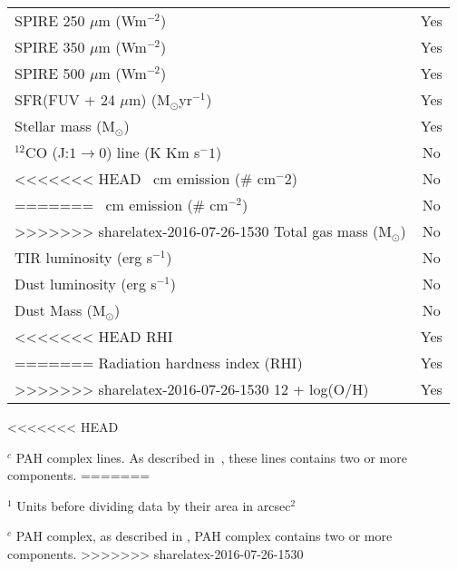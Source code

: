 \begin{table}
\begin{tabular}{ |l|c| }
SPIRE 250 $\mu$m (Wm$^{-2}$)& Yes\\
SPIRE 350 $\mu$m (Wm$^{-2}$)& Yes\\
SPIRE 500 $\mu$m (Wm$^{-2}$)& Yes\\
SFR(FUV + 24 $\mu$m) (M$_{\odot}$yr$^{-1}$) & Yes\\
Stellar mass (M$_{\odot}$)& Yes\\
$^{12}$CO (J:$1\rightarrow0$) line (K Km s$^-1$) & No \\
<<<<<<< HEAD
\hi 21~cm emission ($\#$ cm$^-2$) & No \\
=======
\hi 21~cm emission ($\#$ cm$^{-2}$) & No \\
>>>>>>> sharelatex-2016-07-26-1530
Total gas mass (M$_{\odot}$) & No \\
TIR luminosity (erg s$^{-1}$) & No \\
Dust luminosity (erg s$^{-1}$) & No \\
Dust Mass (M$_{\odot}$)& No\\
<<<<<<< HEAD
RHI & Yes\\
=======
Radiation hardness index (RHI) & Yes\\
>>>>>>> sharelatex-2016-07-26-1530
12 + log(O/H)& Yes\\
\hline
\end{tabular}
\begin{tablenotes}
<<<<<<< HEAD
\item $^c$ PAH  complex lines. As described in~\cite{Smith07a}, these lines contains two or more components.
=======
\item $^1$ Units before dividing data by their area in arcsec$^{2}$
\item $^c$ PAH complex, as described in \cite{Smith07a}, PAH complex contains two or more components.
>>>>>>> sharelatex-2016-07-26-1530
\end{tablenotes}
\end{table}